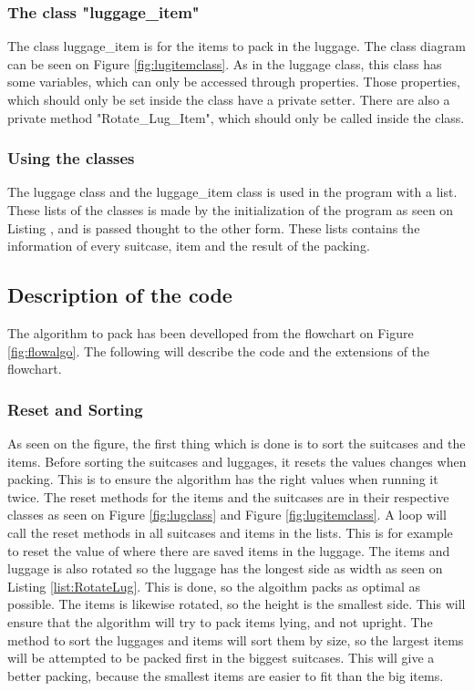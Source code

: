 \subsubsection{The class "luggage\_item"}
The class luggage\_item is for the items to pack in the luggage. The class diagram can be seen on Figure \ref{fig:lugitemclass}. As in the luggage class, this class has some variables, which can only be accessed through properties. Those properties, which should only be set inside the class have a private setter. There are also a private method "Rotate\_Lug\_Item", which should only be called inside the class.
\subsubsection{Using the classes}
The luggage class and the luggage\_item class is used in the program with a list. These lists of the classes is made by the initialization of the program as seen on Listing , and is passed thought to the other form. These lists contains the information of every suitcase, item and the result of the packing.
\subsection{Description of the code}
The algorithm to pack has been develloped from the flowchart on Figure \ref{fig:flowalgo}. The following will describe the code and the extensions of the flowchart.
\subsubsection{Reset and Sorting}
As seen on the figure, the first thing which is done is to sort the suitcases and the items. Before sorting the suitcases and luggages, it resets the values changes when packing. This is to ensure the algorithm has the right values when running it twice. The reset methods for the items and the suitcases are in their respective classes as seen on Figure \ref{fig:lugclass} and Figure \ref{fig:lugitemclass}. A loop will call the reset methods in all suitcases and items in the lists. This is for example to reset the value of where there are saved items in the luggage. The items and luggage is also rotated so the luggage has the longest side as width as seen on Listing \ref{list:RotateLug}. This is done, so the algoithm packs as optimal as possible. The items is likewise rotated, so the height is the smallest side. This will ensure that the algorithm will try to pack items lying, and not upright.
The method to sort the luggages and items will sort them by size, so the largest items will be attempted to be packed first in the biggest suitcases. This will give a better packing, because the smallest items are easier to fit than the big items.
